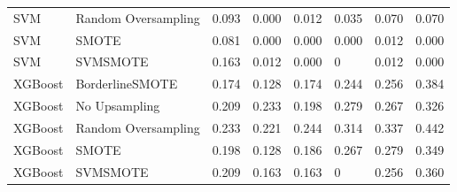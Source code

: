 \begin{tabular}{llllllll}
                         SVM & Random Oversampling & 0.093 &                     0.000 &                 0.012 &                  0.035 &                                   0.070 &     0.070 \\
                         SVM &               SMOTE & 0.081 &                     0.000 &                 0.000 &                  0.000 &                                   0.012 &     0.000 \\
                         SVM &            SVMSMOTE & 0.163 &                     0.012 &                 0.000 &                      0 &                                   0.012 &     0.000 \\
                     XGBoost &     BorderlineSMOTE & 0.174 &                     0.128 &                 0.174 &                  0.244 &                                   0.256 &     0.384 \\
                     XGBoost &       No Upsampling & 0.209 &                     0.233 &                 0.198 &                  0.279 &                                   0.267 &     0.326 \\
                     XGBoost & Random Oversampling & 0.233 &                     0.221 &                 0.244 &                  0.314 &                                   0.337 &     0.442 \\
                     XGBoost &               SMOTE & 0.198 &                     0.128 &                 0.186 &                  0.267 &                                   0.279 &     0.349 \\
                     XGBoost &            SVMSMOTE & 0.209 &                     0.163 &                 0.163 &                      0 &                                   0.256 &     0.360 \\
\bottomrule
\end{tabular}
